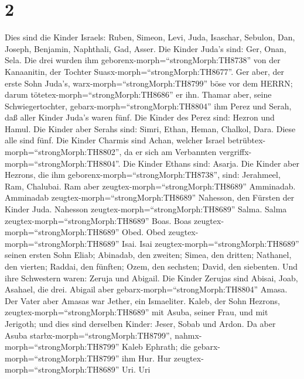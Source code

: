 \hypertarget{section-1}{%
\section{2}\label{section-1}}

 Dies sind die Kinder Israels: Ruben, Simeon, Levi, Juda,
Isaschar, Sebulon,  Dan, Joseph, Benjamin, Naphthali, Gad,
Asser.  Die Kinder Juda's sind: Ger, Onan, Sela. Die drei
wurden ihm geborenx-morph=``strongMorph:TH8738'' von der Kanaanitin, der
Tochter Suasx-morph=``strongMorph:TH8677''. Ger aber, der erste Sohn
Juda's, warx-morph=``strongMorph:TH8799'' böse vor dem HERRN; darum
tötetex-morph=``strongMorph:TH8686'' er ihn.  Thamar aber,
seine Schwiegertochter, gebarx-morph=``strongMorph:TH8804'' ihm Perez
und Serah, daß aller Kinder Juda's waren fünf.  Die Kinder
des Perez sind: Hezron und Hamul.  Die Kinder aber Serahs
sind: Simri, Ethan, Heman, Chalkol, Dara. Diese alle sind fünf.
 Die Kinder Charmis sind Achan, welcher Israel
betrübtex-morph=``strongMorph:TH8802'', da er sich am Verbannten
vergriffx-morph=``strongMorph:TH8804''.  Die Kinder Ethans
sind: Asarja.  Die Kinder aber Hezrons, die ihm
geborenx-morph=``strongMorph:TH8738'', sind: Jerahmeel, Ram, Chalubai.
 Ram aber zeugtex-morph=``strongMorph:TH8689'' Amminadab.
Amminadab zeugtex-morph=``strongMorph:TH8689'' Nahesson, den Fürsten der
Kinder Juda.  Nahesson zeugtex-morph=``strongMorph:TH8689''
Salma. Salma zeugtex-morph=``strongMorph:TH8689'' Boas. 
Boas zeugtex-morph=``strongMorph:TH8689'' Obed. Obed
zeugtex-morph=``strongMorph:TH8689'' Isai.  Isai
zeugtex-morph=``strongMorph:TH8689'' seinen ersten Sohn Eliab; Abinadab,
den zweiten; Simea, den dritten;  Nathanel, den vierten;
Raddai, den fünften;  Ozem, den sechsten; David, den
siebenten.  Und ihre Schwestern waren: Zeruja und Abigail.
Die Kinder Zerujas sind Abisai, Joab, Asahael, die drei. 
Abigail aber gebarx-morph=``strongMorph:TH8804'' Amasa. Der Vater aber
Amasas war Jether, ein Ismaeliter.  Kaleb, der Sohn
Hezrons, zeugtex-morph=``strongMorph:TH8689'' mit Asuba, seiner Frau,
und mit Jerigoth; und dies sind derselben Kinder: Jeser, Sobab und
Ardon.  Da aber Asuba starbx-morph=``strongMorph:TH8799'',
nahmx-morph=``strongMorph:TH8799'' Kaleb Ephrath; die
gebarx-morph=``strongMorph:TH8799'' ihm Hur.  Hur
zeugtex-morph=``strongMorph:TH8689'' Uri. Uri
